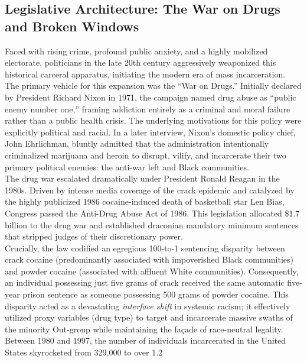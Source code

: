 \documentclass[
]{article}
\begin{document}
\subsection{\texorpdfstring{\textbf{Legislative Architecture: The War on
Drugs and Broken
Windows}}{Legislative Architecture: The War on Drugs and Broken Windows}}\label{legislative-architecture-the-war-on-drugs-and-broken-windows}

Faced with rising crime, profound public anxiety, and a highly mobilized
electorate, politicians in the late 20th century aggressively weaponized
this historical carceral apparatus, initiating the modern era of mass
incarceration.\\
The primary vehicle for this expansion was the ``War on Drugs.''
Initially declared by President Richard Nixon in 1971, the campaign
named drug abuse as ``public enemy number one,'' framing addiction
entirely as a criminal and moral failure rather than a public health
crisis. The underlying motivations for this policy were explicitly
political and racial. In a later interview, Nixon's domestic policy
chief, John Ehrlichman, bluntly admitted that the administration
intentionally criminalized marijuana and heroin to disrupt, vilify, and
incarcerate their two primary political enemies: the anti-war left and
Black communities.\\
The drug war escalated dramatically under President Ronald Reagan in the
1980s. Driven by intense media coverage of the crack epidemic and
catalyzed by the highly publicized 1986 cocaine-induced death of
basketball star Len Bias, Congress passed the Anti-Drug Abuse Act of
1986. This legislation allocated \$1.7 billion to the drug war and
established draconian mandatory minimum sentences that stripped judges
of their discretionary power.\\
Crucially, the law codified an egregious 100-to-1 sentencing disparity
between crack cocaine (predominantly associated with impoverished Black
communities) and powder cocaine (associated with affluent White
communities). Consequently, an individual possessing just five grams of
crack received the same automatic five-year prison sentence as someone
possessing 500 grams of powder cocaine. This disparity acted as a
devastating \emph{interface shift} in systemic racism; it effectively
utilized proxy variables (drug type) to target and incarcerate massive
swaths of the minority Out-group while maintaining the façade of
race-neutral legality. Between 1980 and 1997, the number of individuals
incarcerated in the United States skyrocketed from 329,000 to over 1.2
\end{document}
